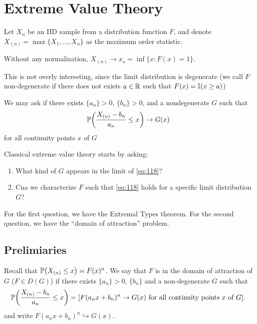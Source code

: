 
\chapter{Extreme Value Theory}
\label{cha:extreme-value-theory}

Let $X_{n}$ be an IID sample from a distribution function $F$, and
denote $X_{(n)} = \max \{ X_{1}, \dots, X_{n} \}$ as the maximum order
statistic.

Without any normalization, $X_{(n)} \rightarrow x_{\star} = \inf \{ x:
F(x) = 1 \}$.

This is not overly interesting, since the limit distribution is
degenerate (we call $F$ non-degenerate if there does not exists $a \in
\mathbb{R}$ such that $F(x) = \I{x \geq a}$)

We may ask if there exists $\{ a_{n} \} > 0$, $\{ b_{n} \} > 0$, and a
nondegenerate $G$ such that
\begin{equation}
  \label{eq:118}
  \Prob{\frac{X_{(n)} - b_{n}}{a_{n}} \leq x} \rightarrow G(x)
\end{equation} for all continuity points $x$ of $G$

Classical extreme value theory starts by asking:
\begin{enumerate}
\item What kind of $G$ appears in the limit of \eqref{eq:118}?
\item Cna we characterize $F$ such that \eqref{eq:118} holds for a
  specific limit distribution $G$?
\end{enumerate}

For the first question, we have the Extremal Types theorem. For the
second question, we have the ``domain of attraction'' problem.


\section{Prelimiaries}
\label{sec:prelimiaries}

Recall that $\Prob{X_{(n)} \leq x} = F(x)^{n}$.  We say that $F$ is in
the domain of attraction of $G$ ($F \in D(G)$) if there exists $\{ a_{n} \} > 0$, $\{
b_{n} \} $ and a non-degenerate $G$ such that
\begin{equation}
  \label{eq:119}
  \Prob{\frac{X_{(n)} - b_{n}}{a_{n}} \leq x} = [\text{$F(a_{n} x +
    b_{n})^{n} \rightarrow G(x)$ for all continuity points $x$ of $G$}].
\end{equation} and write $F(a_{n} x + b_{n})^{n} \hookrightarrow G(x)$.

